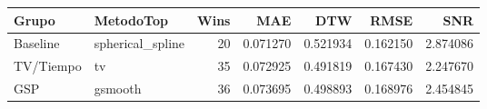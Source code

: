 \begin{tabular}{llrrrrr}
\toprule
Grupo & MetodoTop & Wins & MAE & DTW & RMSE & SNR \\
\midrule
Baseline & spherical\_spline & 20 & 0.071270 & 0.521934 & 0.162150 & 2.874086 \\
TV/Tiempo & tv & 35 & 0.072925 & 0.491819 & 0.167430 & 2.247670 \\
GSP & gsmooth & 36 & 0.073695 & 0.498893 & 0.168976 & 2.454845 \\
\bottomrule
\end{tabular}